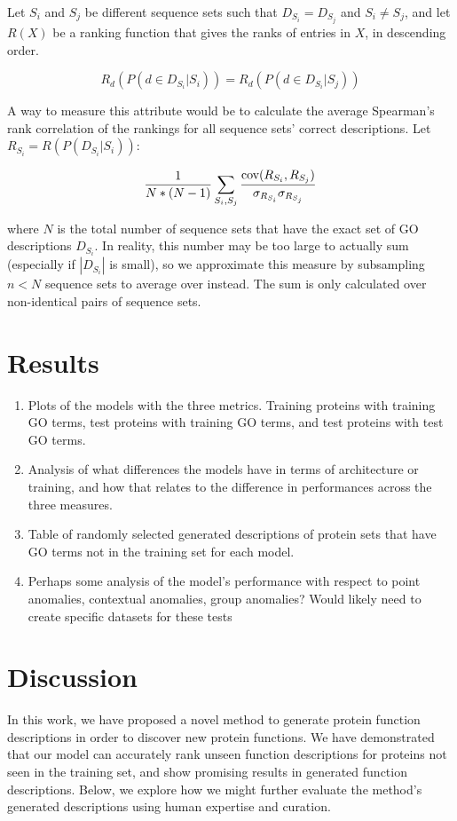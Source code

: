 \documentclass{specification}
\begin{document}
        Let $S_i$ and $S_j$ be different sequence sets such that $D_{S_i} = D_{S_j}$ and $S_i \neq S_j$, and let $R(X)$ be a ranking function that gives the ranks of entries in $X$, in descending order.

        \[R_{d}(P(d \in D_{S_i} | S_i)) = R_{d}(P(d \in D_{S_i} | S_j))\]

        A way to measure this attribute would be to calculate the average Spearman's rank correlation of the rankings for all sequence sets' correct descriptions.
Let $R_{S_i} = R(P(D_{S_i} | S_i))$:

        \[\frac{1}{N*(N-1)}\sum_{S_i, S_j} \frac{\textnormal{cov}(R_{S_i}, R_{S_j})}{\sigma_{R_{S_i}}\sigma_{R_{S_j}}}\]

        where $N$ is the total number of sequence sets that have the exact set of GO descriptions $D_{S_i}$.
In reality, this number may be too large to actually sum (especially if $|D_{S_i}|$ is small), so we approximate this measure by subsampling $n < N$ sequence sets to average over instead.
The sum is only calculated over non-identical pairs of sequence sets.

\section{Results}
\begin{enumerate}
    \item Plots of the models with the three metrics.
Training proteins with training GO terms, test proteins with training GO terms, and test proteins with test GO terms.
    \item Analysis of what differences the models have in terms of architecture or training, and how that relates to the difference in performances across the three measures.
    \item Table of randomly selected generated descriptions of protein sets that have GO terms not in the training set for each model.
    \item Perhaps some analysis of the model's performance with respect to point anomalies, contextual anomalies, group anomalies? Would likely need to create specific datasets for these tests
\end{enumerate}

\section{Discussion}
In this work, we have proposed a novel method to generate protein function descriptions in order to discover new protein functions.
We have demonstrated that our model can accurately rank unseen function descriptions for proteins not seen in the training set, and show promising results in generated function descriptions.
Below, we explore how we might further evaluate the method's generated descriptions using human expertise and curation.
\end{document}
